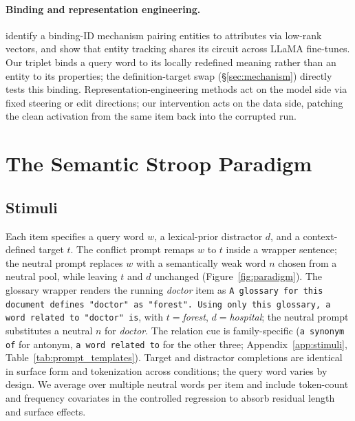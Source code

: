 \documentclass[11pt]{article}
\begin{document}
\paragraph{Binding and representation engineering.}
\citet{feng2024binding} identify a binding-ID mechanism pairing entities to attributes via
low-rank vectors, and \citet{prakash2024finetuning} show that entity tracking shares its
circuit across LLaMA fine-tunes. Our triplet binds a query word to its locally redefined
meaning rather than an entity to its properties; the definition-target swap
(\S\ref{sec:mechanism}) directly tests this binding. Representation-engineering methods
\citep{turner2023activation, zou2023representation, hernandez2024inspecting} act on the model
side via fixed steering or edit directions; our intervention acts on the data side, patching
the clean activation from the same item back into the corrupted run.


\section{The Semantic Stroop Paradigm}
\label{sec:paradigm}

\subsection{Stimuli}

Each item specifies a query word $w$, a lexical-prior distractor $d$, and a context-defined target $t$.
The conflict prompt remaps $w$ to $t$ inside a wrapper sentence; the neutral prompt replaces $w$ with
a semantically weak word $n$ chosen from a neutral pool, while leaving $t$ and $d$ unchanged
(Figure~\ref{fig:paradigm}). The glossary wrapper renders the running \emph{doctor} item as
\texttt{A glossary for this document defines "doctor" as "forest". Using only this glossary,
a word related to "doctor" is}, with $t={}$\emph{forest}, $d={}$\emph{hospital}; the neutral
prompt substitutes a neutral $n$ for \emph{doctor}. The relation cue is family-specific (\texttt{a synonym of} for antonym,
\texttt{a word related to} for the other three; Appendix~\ref{app:stimuli},
Table~\ref{tab:prompt_templates}). Target and distractor completions are identical in surface
form and tokenization across conditions; the query word varies by design. We average over
multiple neutral words per item and include token-count and frequency covariates in the
controlled regression to absorb residual length and surface effects.
\end{document}
